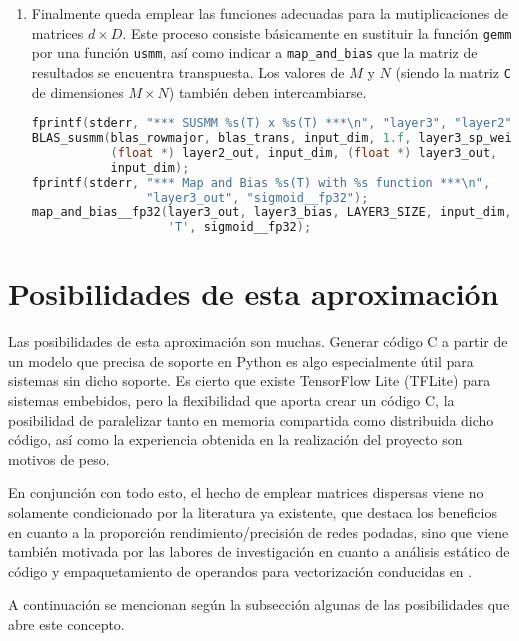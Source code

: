 \begin{enumerate}
    \item Finalmente queda emplear las funciones adecuadas para la mutiplicaciones de matrices $d \times D$. Este proceso consiste básicamente en sustituir la función \texttt{gemm} por una función \texttt{usmm}, así como indicar a \texttt{map\_and\_bias} que la matriz de resultados se encuentra transpuesta. Los valores de $M$ y $N$ (siendo la matriz \texttt{C} de dimensiones $M\times N$) también deben intercambiarse.
\begin{lstlisting}[language=C]
fprintf(stderr, "*** SUSMM %s(T) x %s(T) ***\n", "layer3", "layer2");
BLAS_susmm(blas_rowmajor, blas_trans, input_dim, 1.f, layer3_sp_weights,
           (float *) layer2_out, input_dim, (float *) layer3_out,
           input_dim);
fprintf(stderr, "*** Map and Bias %s(T) with %s function ***\n",
                "layer3_out", "sigmoid__fp32");
map_and_bias__fp32(layer3_out, layer3_bias, LAYER3_SIZE, input_dim,
                   'T', sigmoid__fp32);
\end{lstlisting}
\end{enumerate}

\section{Posibilidades de esta aproximación}
\label{sec:posibilidades_esta_aproximacion}
Las posibilidades de esta aproximación son muchas. Generar código C a partir de un modelo que precisa de soporte en Python es algo especialmente útil para sistemas sin dicho soporte. Es cierto que existe TensorFlow Lite (TFLite) para sistemas embebidos, pero la flexibilidad que aporta crear un código C, la posibilidad de paralelizar tanto en memoria compartida como distribuida dicho código, así como la experiencia obtenida en la realización del proyecto son motivos de peso.

En conjunción con todo esto, el hecho de emplear matrices dispersas viene no solamente condicionado por la literatura ya existente, que destaca los beneficios en cuanto a la proporción rendimiento/precisión de redes podadas, sino que viene también motivada por las labores de investigación en cuanto a análisis estático de código y empaquetamiento de operandos para vectorización conducidas en \cite{exploring_simd_instructions_packing_marcos_horro}.

A continuación se mencionan según la subsección algunas de las posibilidades que abre este concepto.

